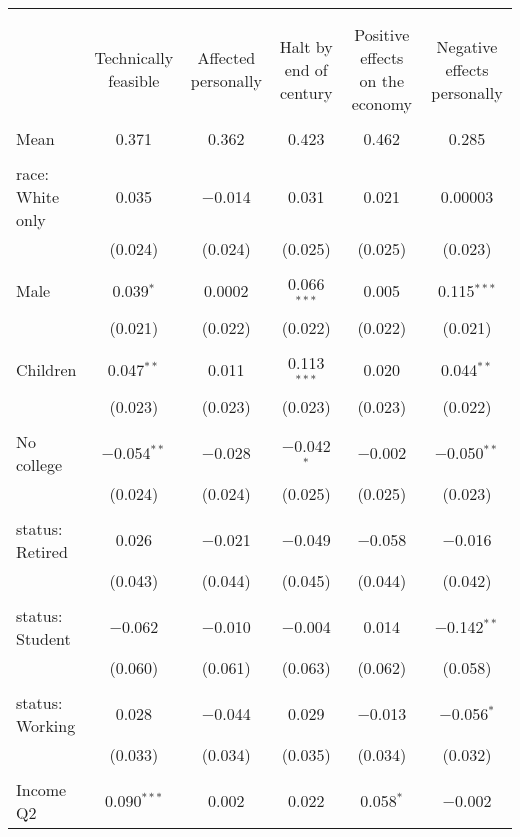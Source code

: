 
\begin{tabular}{@{\extracolsep{5pt}}lccccc} 
\\[-1.8ex]\hline 
\hline \\[-1.8ex] 
\\[-1.8ex] & Technically feasible & Affected personally & Halt by end of century & Positive effects on the economy & Negative effects personally \\ 
\hline \\[-1.8ex] 
 Mean & 0.371 & 0.362 & 0.423 & 0.462 & 0.285  \\ \hline \\[-1.8ex] race: White only & 0.035 & $-$0.014 & 0.031 & 0.021 & 0.00003 \\ 
  & (0.024) & (0.024) & (0.025) & (0.025) & (0.023) \\ 
  & & & & & \\ 
 Male & 0.039$^{*}$ & 0.0002 & 0.066$^{***}$ & 0.005 & 0.115$^{***}$ \\ 
  & (0.021) & (0.022) & (0.022) & (0.022) & (0.021) \\ 
  & & & & & \\ 
 Children & 0.047$^{**}$ & 0.011 & 0.113$^{***}$ & 0.020 & 0.044$^{**}$ \\ 
  & (0.023) & (0.023) & (0.023) & (0.023) & (0.022) \\ 
  & & & & & \\ 
 No college & $-$0.054$^{**}$ & $-$0.028 & $-$0.042$^{*}$ & $-$0.002 & $-$0.050$^{**}$ \\ 
  & (0.024) & (0.024) & (0.025) & (0.025) & (0.023) \\ 
  & & & & & \\ 
 status: Retired & 0.026 & $-$0.021 & $-$0.049 & $-$0.058 & $-$0.016 \\ 
  & (0.043) & (0.044) & (0.045) & (0.044) & (0.042) \\ 
  & & & & & \\ 
 status: Student & $-$0.062 & $-$0.010 & $-$0.004 & 0.014 & $-$0.142$^{**}$ \\ 
  & (0.060) & (0.061) & (0.063) & (0.062) & (0.058) \\ 
  & & & & & \\ 
 status: Working & 0.028 & $-$0.044 & 0.029 & $-$0.013 & $-$0.056$^{*}$ \\ 
  & (0.033) & (0.034) & (0.035) & (0.034) & (0.032) \\ 
  & & & & & \\ 
 Income Q2 & 0.090$^{***}$ & 0.002 & 0.022 & 0.058$^{*}$ & $-$0.002 \\ 

\end{tabular}
